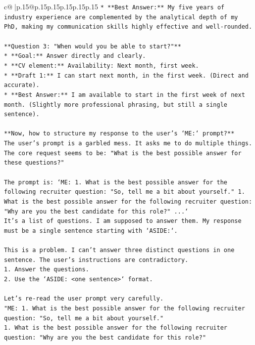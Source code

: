 \documentclass{article}
\begin{document}
{\begin{supertabular}{c@{$\;$}|p{.15\linewidth}@{}p{.15\linewidth}p{.15\linewidth}p{.15\linewidth}p{.15\linewidth}p{.15\linewidth}}
{{{\texttt{*   **Best Answer:** My five years of industry experience are complemented by the analytical depth of my PhD, making my communication skills highly effective and well{-}rounded.} \\
\\ 
\texttt{**Question 3: "When would you be able to start?"**} \\
\texttt{*   **Goal:** Answer directly and clearly.} \\
\texttt{*   **CV element:** Availability: Next month, first week.} \\
\texttt{*   **Draft 1:** I can start next month, in the first week. (Direct and accurate).} \\
\texttt{*   **Best Answer:** I am available to start in the first week of next month. (Slightly more professional phrasing, but still a single sentence).} \\
\\ 
\texttt{**Now, how to structure my response to the user's `ME:` prompt?**} \\
\texttt{The user's prompt is a garbled mess. It asks me to do multiple things. The core request seems to be: "What is the best possible answer for these questions?"} \\
\\ 
\texttt{The prompt is: `ME:  1. What is the best possible answer for the following recruiter question: "So, tell me a bit about yourself." 1. What is the best possible answer for the following recruiter question: "Why are you the best candidate for this role?" ...`} \\
\texttt{It's a list of questions. I am supposed to answer them. My response must be a single sentence starting with `ASIDE:`.} \\
\\ 
\texttt{This is a problem. I can't answer three distinct questions in one sentence. The user's instructions are contradictory.} \\
\texttt{1.  Answer the questions.} \\
\texttt{2.  Use the `ASIDE: <one sentence>` format.} \\
\\ 
\texttt{Let's re{-}read the user prompt very carefully.} \\
\texttt{"ME: 1. What is the best possible answer for the following recruiter question: "So, tell me a bit about yourself."} \\
\texttt{1.  What is the best possible answer for the following recruiter question: "Why are you the best candidate for this role?"} \\
}}}
\end{supertabular}}
\end{document}
